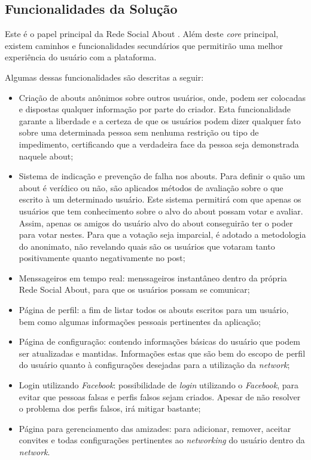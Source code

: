 \subsection{Funcionalidades da Solução}
\label{sub:propostadesolucao}
Este é o papel principal da Rede Social About . Além deste \textit{core} principal, existem caminhos e funcionalidades
secundários  que permitirão uma melhor experiência do usuário com a plataforma.

Algumas dessas funcionalidades são descritas a seguir:

\begin{itemize}
    \item Criação de abouts anônimos sobre outros usuários, onde, podem ser colocadas e dispostas
        qualquer informação por parte do criador. Esta funcionalidade garante a liberdade
        e a certeza de que os usuários podem dizer qualquer fato sobre uma determinada pessoa
        sem nenhuma restrição ou tipo de impedimento, certificando que a verdadeira
        face da pessoa seja demonstrada naquele about;
    \item Sistema de indicação e prevenção de falha nos abouts. Para definir o quão um about é
        verídico ou não, são aplicados métodos de avaliação sobre o que escrito
        à um determinado usuário. Este sistema permitirá com que apenas os usuários que tem
        conhecimento sobre o alvo do about possam votar e avaliar. Assim, apenas
        os amigos do usuário alvo do about conseguirão ter o poder para votar nestes.
        Para que a votação seja imparcial, é adotado a metodologia do anonimato,
        não revelando quais são os usuários que votaram tanto positivamente quanto negativamente
        no post;
    \item Menssageiros em tempo real: menssageiros instantâneo dentro da própria Rede Social About, para que os usuários possam se
        comunicar;
    \item Página de perfil: a fim de listar todos os abouts escritos para um usuário, bem como algumas informações
        pessoais pertinentes da aplicação;
    \item Página de configuração: contendo informações básicas do usuário que podem ser atualizadas e mantidas.
        Informações estas que são bem do escopo de perfil do usuário quanto à configurações desejadas
        para a utilização da \textit{network};
    \item Login utilizando \textit{Facebook}: possibilidade de \textit{login} utilizando o \textit{Facebook}, para evitar que pessoas
        falsas e perfis falsos sejam criados. Apesar de não resolver o problema dos perfis falsos,
        irá mitigar bastante;
    \item Página para gerenciamento das amizades: para adicionar, remover, aceitar convites e todas configurações
        pertinentes ao \textit{networking} do usuário dentro da \textit{network}.
\end{itemize}

